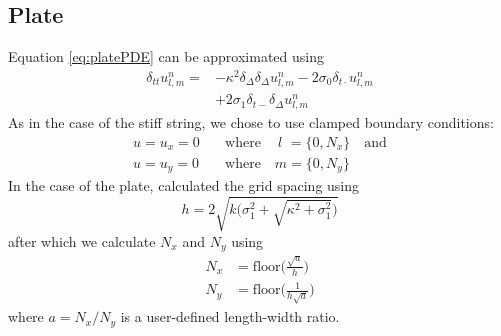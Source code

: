 \documentclass{article}
\begin{document}
\subsection{Plate}
Equation \eqref{eq:platePDE} can be approximated using
\begin{equation}
    \begin{aligned}\label{eq:plateFDS}
        \delta_{tt}u_{l,m}^n = &-\kappa^2 \delta_\Delta\delta_\Delta u_{l,m}^n - 2\sigma_0\delta_{t\cdot}u_{l,m}^n \\
        &+ 2\sigma_1\delta_{t-}\delta_\Delta u_{l,m}^n
    \end{aligned}
\end{equation}
As in the case of the stiff string, we chose to use clamped boundary conditions:
\begin{equation}
    \begin{aligned}
        u = u_x = 0 \quad &\text{where} \quad \: l \, \, = \{0, N_x\} \quad \text{and} \\
        u = u_y = 0 \quad &\text{where} \quad m = \{0, N_y\}
    \end{aligned}
\end{equation}
In the case of the plate, calculated the grid spacing using \cite{Bilbao2009:ModularPercussion}
\begin{equation}
h = 2\sqrt{k\bigg(\sigma_1^2 + \sqrt{\kappa^2+ \sigma_1^2}\bigg)}
\end{equation}
after which we calculate $N_x$ and $N_y$ using
\begin{align}
    N_x &= \text{floor}\Bigg(\frac{\sqrt{a}}{h}\Bigg)\\
    N_y &= \text{floor}\Bigg(\frac{1}{h\sqrt{a}}\Bigg)
\end{align}
where $a = N_x / N_y$ is a user-defined length-width ratio.
\end{document}
